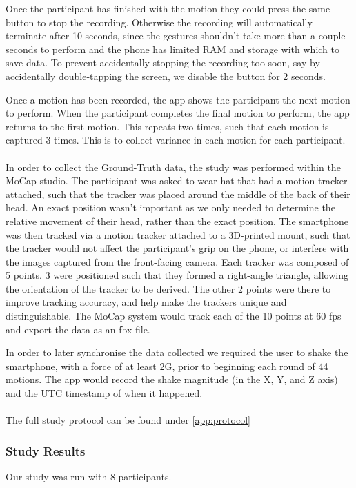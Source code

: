 Once the participant has finished with the motion they could press the same button to stop the recording. Otherwise the recording will automatically terminate after 10 seconds, since the gestures shouldn't take more than a couple seconds to perform and the phone has limited RAM and storage with which to save data.
To prevent accidentally stopping the recording too soon, say by accidentally double-tapping the screen, we disable the button for 2 seconds.

Once a motion has been recorded, the app shows the participant the next motion to perform. When the participant completes the final motion to perform, the app returns to the first motion. This repeats two times, such that each motion is captured 3 times. This is to collect variance in each motion for each participant.
\\\\
In order to collect the Ground-Truth data, the study was performed within the MoCap studio. The participant was asked to wear hat that had a motion-tracker attached, such that the tracker was placed around the middle of the back of their head. An exact position wasn't important as we only needed to determine the relative movement of their head, rather than the exact position.
The smartphone was then tracked via a motion tracker attached to a 3D-printed mount, such that the tracker would not affect the participant's grip on the phone, or interfere with the images captured from the front-facing camera.
Each tracker was composed of 5 points. 3 were positioned such that they formed a right-angle triangle, allowing the orientation of the tracker to be derived. The other 2 points were there to improve tracking accuracy, and help make the trackers unique and distinguishable.
The MoCap system would track each of the 10 points at 60 fps and export the data as an fbx file.

In order to later synchronise the data collected we required the user to shake the smartphone, with a force of at least 2G, prior to beginning each round of 44 motions. The app would record the shake magnitude (in the X, Y, and Z axis) and the UTC timestamp of when it happened.
\\\\
The full study protocol can be found under \autoref{app:protocol}

\subsubsection{Study Results}
Our study was run with 8 participants.

